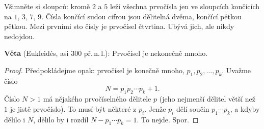 \begin{center}
\end{center}

Všimněte si sloupců: kromě $2$ a $5$ leží všechna prvočísla jen ve sloupcích končících na $1$, $3$, $7$, $9$. Čísla končící sudou cifrou jsou dělitelná dvěma, končící pětkou pětkou. Mezi prvními sto čísly je prvočísel čtvrtina. Ubývá jich, ale nikdy nedojdou.

\begin{definitionbox}
  \textbf{Věta} (Eukleidés, asi 300 př.\,n.\,l.): Prvočísel je nekonečně mnoho.
\end{definitionbox}

\begin{proof}
  Předpokládejme opak: prvočísel je konečně mnoho, $p_1, p_2, \ldots, p_k$. Uvažme číslo
  \begin{equation*}
    N = p_1p_2\cdots p_k + 1.
  \end{equation*}
  Číslo $N > 1$ má nějakého prvočíselného dělitele $p$ (jeho nejmenší dělitel větší než $1$ je jistě prvočíslo). To musí být některé z $p_i$. Jenže $p_i$ dělí součin $p_1\cdots p_k$, a kdyby dělilo i $N$, dělilo by i rozdíl $N - p_1\cdots p_k = 1$. To nejde. Spor.
\end{proof}

